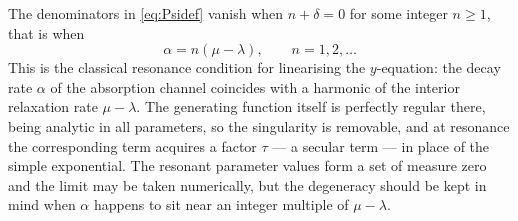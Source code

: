 \begin{remark}[Resonance]
\label{rem:resonance}
The denominators in \cref{eq:Psidef} vanish when $n+\delta=0$ for some integer
$n\ge1$, that is when
\begin{equation*}
\alpha = n(\mu-\lambda),\qquad n=1,2,\dots
\end{equation*}
This is the classical resonance condition for linearising the $y$-equation: the
decay rate $\alpha$ of the absorption channel coincides with a harmonic of the
interior relaxation rate $\mu-\lambda$. The generating function itself is perfectly
regular there, being analytic in all parameters, so the singularity is removable,
and at resonance the corresponding term acquires a factor $\tau$ --- a secular term
--- in place of the simple exponential. The resonant parameter values form a set of
measure zero and the limit may be taken numerically, but the degeneracy should be
kept in mind when $\alpha$ happens to sit near an integer multiple of $\mu-\lambda$.
\end{remark}

\FloatBarrier

